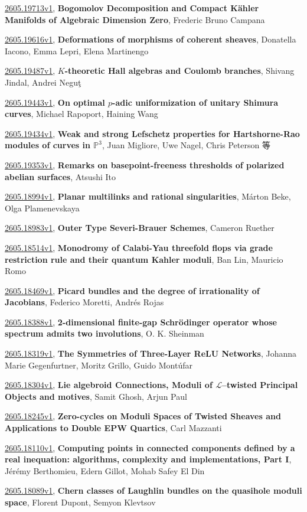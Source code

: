 \documentclass[9pt, a4paper]{article}
\theoremstyle{plain}
\theoremstyle{definition}
\theoremstyle{remark}
\newcommand{\arxiv}[3]{\href{https://arxiv.org/abs/#1}{#1}, \textbf{\textcolor{arxivblue}{#2}}, #3}
\begin{document}
\arxiv{2605.19713v1}{Bogomolov Decomposition and Compact K{ä}hler Manifolds of Algebraic Dimension Zero}{Frederic Bruno Campana}

\arxiv{2605.19616v1}{Deformations of morphisms of coherent sheaves}{Donatella Iacono, Emma Lepri, Elena Martinengo}

\arxiv{2605.19487v1}{$K$-theoretic Hall algebras and Coulomb branches}{Shivang Jindal, Andrei Neguţ}

\arxiv{2605.19443v1}{On optimal $p$-adic uniformization of unitary Shimura curves}{Michael Rapoport, Haining Wang}

\arxiv{2605.19434v1}{Weak and strong Lefschetz properties for Hartshorne-Rao modules of curves in $\mathbb P^3$}{Juan Migliore, Uwe Nagel, Chris Peterson 等}

\arxiv{2605.19353v1}{Remarks on basepoint-freeness thresholds of polarized abelian surfaces}{Atsushi Ito}

\arxiv{2605.18994v1}{Planar multilinks and rational singularities}{Márton Beke, Olga Plamenevskaya}

\arxiv{2605.18983v1}{Outer Type Severi-Brauer Schemes}{Cameron Ruether}

\arxiv{2605.18514v1}{Monodromy of Calabi-Yau threefold flops via grade restriction rule and their quantum Kahler moduli}{Ban Lin, Mauricio Romo}

\arxiv{2605.18469v1}{Picard bundles and the degree of irrationality of Jacobians}{Federico Moretti, Andrés Rojas}

\arxiv{2605.18388v1}{2-dimensional finite-gap Schrödinger operator whose spectrum admits two involutions}{O. K. Sheinman}

\arxiv{2605.18319v1}{The Symmetries of Three-Layer ReLU Networks}{Johanna Marie Gegenfurtner, Moritz Grillo, Guido Montúfar}

\arxiv{2605.18304v1}{Lie algebroid Connections, Moduli of $\mathcal{L}$--twisted Principal Objects and motives}{Samit Ghosh, Arjun Paul}

\arxiv{2605.18245v1}{Zero-cycles on Moduli Spaces of Twisted Sheaves and Applications to Double EPW Quartics}{Carl Mazzanti}

\arxiv{2605.18110v1}{Computing points in connected components defined by a real inequation: algorithms, complexity and implementations, Part I}{Jérémy Berthomieu, Edern Gillot, Mohab Safey El Din}

\arxiv{2605.18089v1}{Chern classes of Laughlin bundles on the quasihole moduli space}{Florent Dupont, Semyon Klevtsov}
\end{document}
